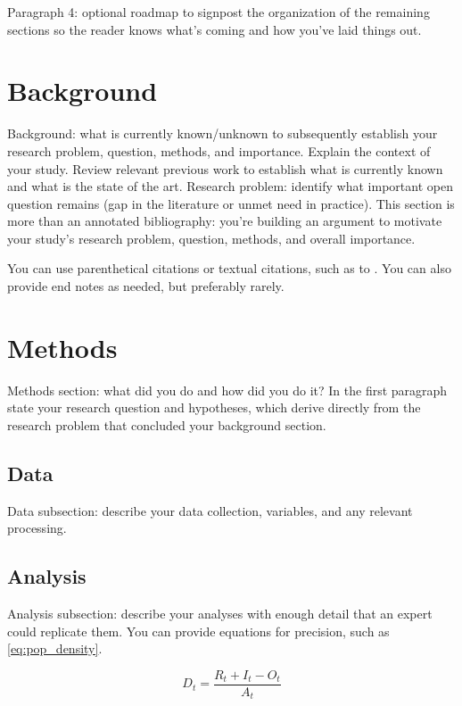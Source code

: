 \documentclass[12pt,letterpaper]{article} %
\begin{document}
Paragraph 4: optional roadmap to signpost the organization of the remaining sections so the reader knows what's coming and how you've laid things out.

\section{Background}

Background: what is currently known/unknown to subsequently establish your research problem, question, methods, and importance. Explain the context of your study. Review relevant previous work to establish what is currently known and what is the state of the art. Research problem: identify what important open question remains (gap in the literature or unmet need in practice). This section is more than an annotated bibliography: you're building an argument to motivate your study's research problem, question, methods, and overall importance.

You can use parenthetical citations \citep[e.g.,][]{boeing_off_2021} or textual citations, such as to \citet[][pp. 93--94]{boarnet_travel_2001}. You can also provide end notes as needed, but preferably rarely.

\section{Methods}

Methods section: what did you do and how did you do it? In the first paragraph state your research question and hypotheses, which derive directly from the research problem that concluded your background section.

\subsection{Data}

Data subsection: describe your data collection, variables, and any relevant processing.

\subsection{Analysis}

Analysis subsection: describe your analyses with enough detail that an expert could replicate them. You can provide equations for precision, such as \autoref{eq:pop_density}.

\begin{equation}
    \label{eq:pop_density}
    D_t = \frac{R_t + I_t - O_t}{A_t}
\end{equation}
\end{document}
